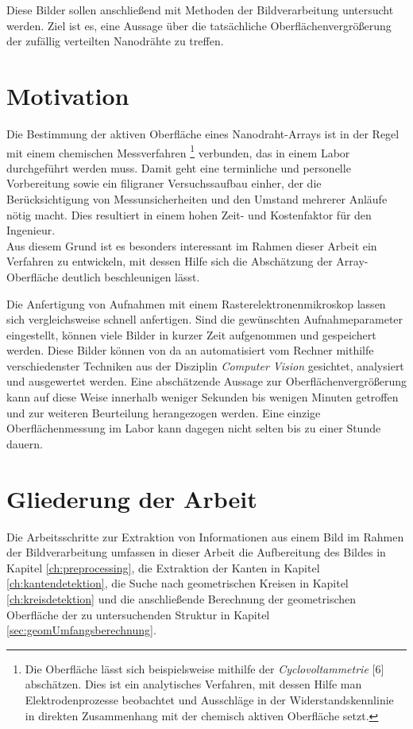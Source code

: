 \documentclass[accentcolor=tud1c, 11pt, toc=bib, toc=listof, captions=abovetable, parskip=half]{tudreport}
\begin{document}
Diese Bilder sollen anschließend mit Methoden der Bildverarbeitung untersucht werden. Ziel ist es, eine Aussage über die tatsächliche Oberflächenvergrößerung der zufällig verteilten Nanodrähte zu treffen. 

\section{Motivation}
Die Bestimmung der aktiven Oberfläche eines Nanodraht-Arrays ist in der Regel mit einem chemischen Messverfahren \footnote{Die Oberfläche lässt sich beispielsweise mithilfe der \emph{Cyclovoltammetrie} [6] abschätzen. Dies ist ein analytisches Verfahren, mit dessen Hilfe man Elektrodenprozesse beobachtet und Ausschläge in der Widerstandskennlinie in direkten Zusammenhang mit der chemisch aktiven Oberfläche setzt.} verbunden, das in einem Labor durchgeführt werden muss. Damit geht eine terminliche und personelle Vorbereitung sowie ein filigraner Versuchssaufbau einher, der die Berücksichtigung von Messunsicherheiten und den Umstand mehrerer Anläufe nötig macht. Dies resultiert in einem hohen Zeit- und Kostenfaktor für den Ingenieur.\\
Aus diesem Grund ist es besonders interessant im Rahmen dieser Arbeit ein Verfahren zu entwickeln, mit dessen Hilfe sich die Abschätzung der Array-Oberfläche deutlich beschleunigen lässt.
 
Die Anfertigung von Aufnahmen mit einem Rasterelektronenmikroskop lassen sich vergleichsweise schnell anfertigen. Sind die gewünschten Aufnahmeparameter eingestellt, können viele Bilder in kurzer Zeit aufgenommen und gespeichert werden. Diese Bilder können von da an automatisiert vom Rechner mithilfe verschiedenster Techniken aus der Disziplin \emph{Computer Vision} gesichtet, analysiert und ausgewertet werden. Eine abschätzende Aussage zur Oberflächenvergrößerung kann auf diese Weise innerhalb weniger Sekunden bis wenigen Minuten getroffen und zur weiteren Beurteilung herangezogen werden. Eine einzige Oberflächenmessung im Labor kann dagegen nicht selten bis zu einer Stunde dauern.

\section{Gliederung der Arbeit}
Die Arbeitsschritte zur Extraktion von Informationen aus einem Bild im Rahmen der Bildverarbeitung umfassen in dieser Arbeit die Aufbereitung des Bildes in Kapitel \ref{ch:preprocessing}, die Extraktion der Kanten in Kapitel \ref{ch:kantendetektion}, die Suche nach geometrischen Kreisen in Kapitel \ref{ch:kreisdetektion} und die anschließende  Berechnung der geometrischen Oberfläche der zu untersuchenden Struktur in Kapitel \ref{sec:geomUmfangsberechnung}.\\
\end{document}
